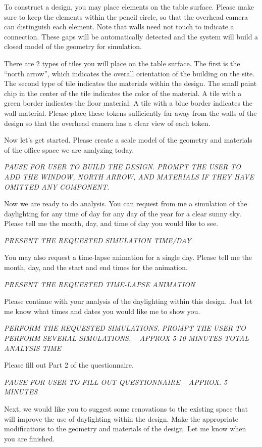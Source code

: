\documentclass[12pt]{article}
\begin{document}
To construct a design, you may place elements on the table
surface. Please make sure to keep the elements within the pencil
circle, so that the overhead camera can distinguish each element.
Note that walls need not touch to indicate a connection.  These gaps
will be automatically detected and the system will build a closed
model of the geometry for simulation.

There are 2 types of tiles you will place on the table surface.  The
first is the ``north arrow'', which indicates the overall orientation
of the building on the site.  The second type of tile indicates the
materials within the design.  The small paint chip in the center of
the tile indicates the color of the material.  A tile with a green
border indicates the floor material.  A tile with a blue border
indicates the wall material.  Please place these tokens sufficiently
far away from the walls of the design so that the overhead camera has
a clear view of each token.

Now let's get started.  Please create a scale model of the geometry
and materials of the office space we are analyzing today.

{\em PAUSE FOR USER TO BUILD THE DESIGN.  PROMPT THE USER TO ADD THE
  WINDOW, NORTH ARROW, AND MATERIALS IF THEY HAVE OMITTED ANY
  COMPONENT. }

Now we are ready to do analysis.  You can request from me a simulation
of the daylighting for any time of day for any day of the year for a
clear sunny sky.  Please tell me the month, day, and time of day you
would like to see.

{\em PRESENT THE REQUESTED SIMULATION TIME/DAY }

You may also request a time-lapse animation for a single day.  Please
tell me the month, day, and the start and end times for the animation.

{\em PRESENT THE REQUESTED TIME-LAPSE ANIMATION }

Please continue with your analysis of the daylighting within this
design.  Just let me know what times and dates you would like me to show
you.

{\em PERFORM THE REQUESTED SIMULATIONS.  PROMPT THE USER TO PERFORM
  SEVERAL SIMULATIONS.  -- APPROX 5-10 MINUTES TOTAL ANALYSIS TIME }

Please fill out Part 2 of the questionnaire.

{\em PAUSE FOR USER TO FILL OUT QUESTIONNAIRE  --  APPROX. 5 MINUTES }

Next, we would like you to suggest some renovations to the existing
space that will improve the use of daylighting within the design.
Make the appropriate modifications to the geometry and materials of
the design.  Let me know when you are finished.
\end{document}
